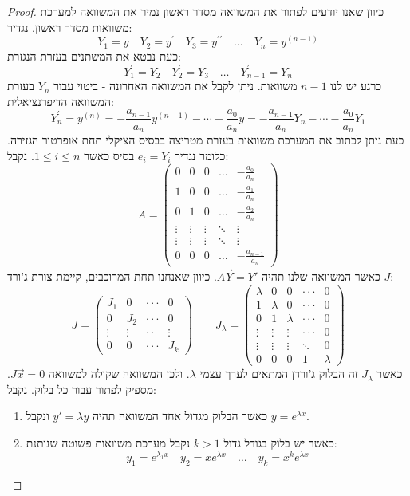 \documentclass{tstextbook}
\begin{document}
\begin{proof}
כיוון שאנו יודעים לפתור את המשוואה מסדר ראשון נמיר את המשוואה למערכת משוואות מסדר ראשון. נגדיר:
$${{Y_{1}=y}}\quad  {{Y_{2}=y^{\prime}}}\quad  {{Y_{3}=y^{\prime\prime}}}\quad  {{\dots}}\quad  {{Y_{n}=y^{(n-1)}}}$$
כעת נבטא את המשתנים בעזרת הנגזרת:
$${{Y_{1}^{\prime}=Y_{2}}}\quad  {{Y_{2}^{\prime}=Y_{3}}}\quad  \dots\quad  {{Y_{n-1}^{\prime}=Y_{n}}}$$
כרגע יש לנו \(n-1\) משוואות. ניתן לקבל את המשוואה האחרונה - ביטוי עבור \(Y_{n}\) בעזרת המשוואה הדיפרנציאלית:
$$Y_{n}^{\prime}=y^{(n)}=-{\frac{a_{n-1}}{a_{n}}}y^{(n-1)}-\cdots-{\frac{a_{0}}{a_{n}}}y=-{\frac{a_{n-1}}{a_{n}}}Y_{n}-\cdots-{\frac{a_{0}}{a_{n}}}Y_{1}$$
כעת ניתן לכתוב את המערכת משוואות בעזרת מטריצה בבסיס הציקלי תחת אופרטור הגזירה. כלומר נגדיר \(e_{i}=Y_{i}\) בסיס כאשר \(1\leq i\leq n\). נקבל:
$$A=\begin{pmatrix}0&0&0&\dots&-{\frac{a_{0}}{a_{n}}}\\ 1&0&0&\dots&-{\frac{a_{1}}{a_{n}}}\\ 0&1&0&\dots&-{\frac{a_{2}}{a_{n}}}\\ \vdots&\vdots&\vdots&\ddots&\vdots\\ \vdots&\vdots&\vdots&\ddots&\vdots\\ 0&0&0&\dots&-{\frac{a_{n-1}}{a_{n}}}\end{pmatrix}$$
כאשר המשוואה שלנו תהיה \(A\vec{Y}=Y'\). כיוון שאנחנו תחת המרוכבים, קיימת צורת ג'ורד \(J\):
$$J=\begin{pmatrix}J_{1}&0&\cdot\cdot\cdot&0\\ 0&J_{2}&\cdot\cdot\cdot&0\\ \vdots&\vdots&\cdot\cdot&\vdots\\ 0&0&\cdot\cdot\cdot&J_{k}\end{pmatrix}\qquad J_{\lambda}=\begin{pmatrix}\lambda&0&0&\cdot\cdot\cdot&0\\ 1&\lambda&0&\cdot\cdot\cdot&0\\ 0&1&\lambda&\cdot\cdot\cdot&0\\ \vdots&\vdots&\vdots&\cdot\cdot\cdot&0\\ \vdots&\vdots&\vdots&\ddots&0\\ 0&0&0&1&\lambda\end{pmatrix}$$
כאשר \(J_{\lambda}\) זה הבלוק ג'ורדן המתאים לערך עצמי \(\lambda\). ולכן המשוואה שקולה למשוואה \(J\vec{x}=0\). מספיק לפתור עבור כל בלוק.
נקבל:

  \begin{enumerate}
    \item כאשר הבלוק מגדול אחד המשוואה תהיה \(y'=\lambda y\) ונקבל \(y=e^{ \lambda x }\). 


    \item כאשר יש בלוק בגודל גדול \(k>1\) נקבל מערכת משוואות פשוטה שנותנת: 
$$y_{1}=e^{\lambda_{1}x}\quad y_{2}=xe^{ \lambda x }\quad \dots \quad y_{k}=x^{k}e^{\lambda x}$$


  \end{enumerate}
\end{proof}
\end{document}
